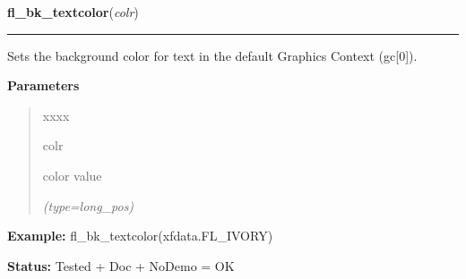 \hspace{.8\funcindent}\begin{boxedminipage}{\funcwidth}

    \raggedright \textbf{fl\_bk\_textcolor}(\textit{colr})

    \vspace{-1.5ex}

    \rule{\textwidth}{0.5\fboxrule}
\setlength{\parskip}{2ex}
    Sets the background color for text in the default Graphics Context 
    (gc[0]).

\setlength{\parskip}{1ex}
      \textbf{Parameters}
      \vspace{-1ex}

      \begin{quote}
        \begin{Ventry}{xxxx}

          \item[colr]

          color value

            {\it (type=long\_pos)}

        \end{Ventry}

      \end{quote}

\textbf{Example:} fl\_bk\_textcolor(xfdata.FL\_IVORY)



\textbf{Status:} Tested + Doc + NoDemo = OK



    \end{boxedminipage}

    \label{xformslib:flbasic:fl_set_gamma}

    \vspace{0.5ex}

